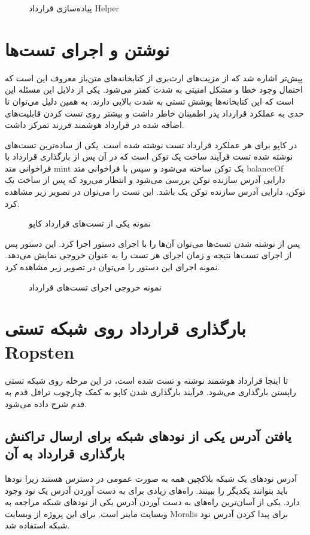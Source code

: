 \begin{figure}[ht]
\centerline{}
\caption{پیاده‌سازی قرارداد Helper}
\label{fig:Helper}
\end{figure}

\section{نوشتن و اجرای تست‌ها}
پیش‌تر اشاره شد که از مزیت‌های ارث‌بری از کتابخانه‌های متن‌باز معروف این است که احتمال وجود خطا و مشکل امنیتی به شدت کمتر می‌شود. یکی از دلایل این مسئله این است که این کتابخانه‌ها پوشش تستی به شدت بالایی دارند. به همین دلیل می‌توان تا حدی به عملکرد قرارداد پدر اطمینان خاطر داشت و بیشتر روی تست کردن قابلیت‌های اضافه شده در قرارداد هوشمند فرزند تمرکز داشت.

در کاپو برای هر عملکرد قرارداد تست نوشته شده است. یکی از ساده‌ترین تست‌های نوشته شده تست فرآیند ساخت یک توکن است که در آن پس از بارگذاری قرارداد با فراخوانی متد mint یک توکن ساخته می‌شود و سپس با فراخوانی متد balanceOf دارایی آدرس سازنده توکن بررسی می‌شود و انتظار می‌رود که پس از ساخت یک توکن، دارایی آدرس سازنده توکن یک باشد. این تست را می‌توان در تصویر زیر مشاهده کرد.

\begin{figure}[ht]
\centerline{}
\caption{نمونه یکی از تست‌های قرارداد کاپو}
\label{fig:mint-test}
\end{figure}

پس از نوشته شدن تست‌ها می‌توان آن‌ها را با اجرای دستور
اجرا کرد. این دستور پس از اجرای تست‌ها نتیجه و زمان اجرای هر تست را به عنوان خروجی نمایش می‌دهد. نمونه اجرای این دستور را می‌توان در تصویر زیر مشاهده کرد.

\begin{figure}[ht]
\centerline{}
\caption{نمونه خروجی اجرای تست‌های قرارداد}
\label{fig:test-output}
\end{figure}

\section{بارگذاری قرارداد روی شبکه تستی \gls{Ropsten}}
تا اینجا قرارداد هوشمند نوشته و تست شده است، در این مرحله روی شبکه تستی راپستن بارگذاری می‌شود. فرآیند بارگذاری شدن کاپو به کمک چارچوب ترافل قدم به قدم شرح داده می‌شود.

\subsection{یافتن آدرس یکی از نود‌های شبکه برای ارسال تراکنش بارگذاری قرارداد به آن}
آدرس نود‌های یک شبکه بلاکچین همه به صورت عمومی در دسترس هستند زیرا نودها باید بتوانند یکدیگر را ببینند. راه‌های زیادی برای به دست آوردن آدرس یک نود وجود دارد. یکی از آسان‌ترین راه‌های به دست آوردن آدرس یکی از نود‌های شبکه مراجعه به وبسایت ماینر است. برای این پروژه از وبسایت Moralis
برای پیدا کردن آدرس نود شبکه استفاده شد.

